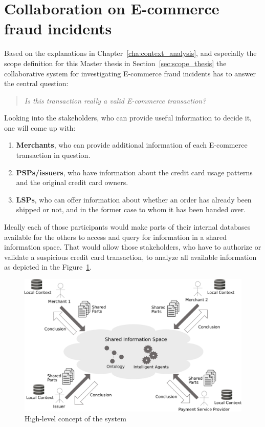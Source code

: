 
\section{Collaboration on \gls{E-commerce} fraud incidents}
\label{sec:concept_overview}

Based on the explanations in Chapter~\ref{cha:context_analysis}, and especially the scope definition for this Master thesis in Section~\ref{sec:scope_thesis} the collaborative system for investigating \gls{E-commerce} fraud incidents has to answer the central question:\@

\begin{quotation}
  \textit{Is this transaction really a valid \gls{E-commerce} transaction?}
\end{quotation}

Looking into the stakeholders, who can provide useful information to decide it, one will come up with:\@

\begin{enumerate}
    \item \textbf{Merchants}, who can provide additional information of each \gls{E-commerce} transaction in question.
    \item \textbf{\gls{PSP}s/issuers}, who have information about the credit card usage patterns and the original credit card owners.
    \item \textbf{\gls{LSP}s}, who can offer information about whether an order has already been shipped or not, and in the former case to whom it has been handed over.
\end{enumerate}

Ideally each of those participants would make parts of their internal databases available for the others to access and query for information in a shared information space. That would allow those stakeholders, who have to authorize or validate a suspicious credit card transaction, to analyze all available information as depicted in the Figure~\ref{fig:images_system_overview}.\@

\begin{figure}[H]
	\centering
		\includegraphics[width=0.9\columnwidth]{images/system_overview.pdf}
	\caption{High-level concept of the system}
\label{fig:images_system_overview}
\end{figure}

